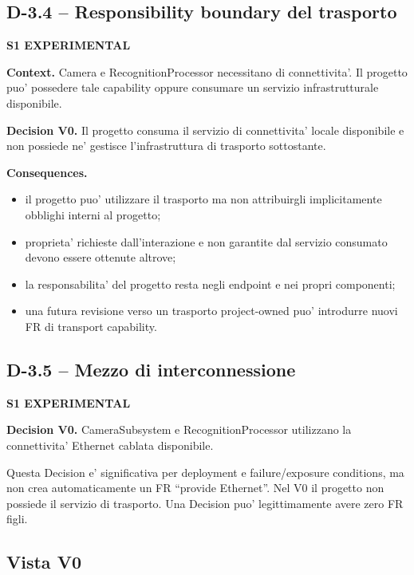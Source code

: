 \documentclass[11pt,a4paper]{article}
\newcommand{\experimental}{\textbf{S1 EXPERIMENTAL}}
\begin{document}
\subsection{D-3.4 -- Responsibility boundary del trasporto}

\experimental{}

\textbf{Context.} Camera e RecognitionProcessor necessitano di connettivita'. Il progetto puo' possedere tale capability oppure consumare un servizio infrastrutturale disponibile.

\textbf{Decision V0.} Il progetto consuma il servizio di connettivita' locale disponibile e non possiede ne' gestisce l'infrastruttura di trasporto sottostante.

\textbf{Consequences.}
\begin{itemize}
  \item il progetto puo' utilizzare il trasporto ma non attribuirgli implicitamente obblighi interni al progetto;
  \item proprieta' richieste dall'interazione e non garantite dal servizio consumato devono essere ottenute altrove;
  \item la responsabilita' del progetto resta negli endpoint e nei propri componenti;
  \item una futura revisione verso un trasporto project-owned puo' introdurre nuovi FR di transport capability.
\end{itemize}

\subsection{D-3.5 -- Mezzo di interconnessione}

\experimental{}

\textbf{Decision V0.} CameraSubsystem e RecognitionProcessor utilizzano la connettivita' Ethernet cablata disponibile.

Questa Decision e' significativa per deployment e failure/exposure conditions, ma non crea automaticamente un FR ``provide Ethernet''. Nel V0 il progetto non possiede il servizio di trasporto. Una Decision puo' legittimamente avere zero FR figli.

\subsection{Vista V0}
\end{document}
